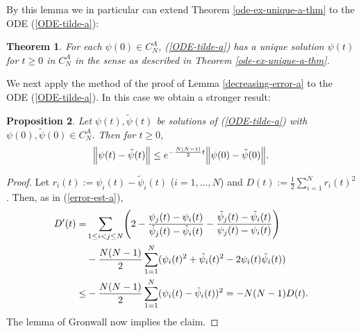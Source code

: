 \documentclass[reqno]{amsart}
\theoremstyle{plain}
\newtheorem{theorem}{Theorem}[section]
\newtheorem{proposition}[theorem]{Proposition}
\theoremstyle{definition}
\numberwithin{equation}{section}
\begin{document}
By this lemma we in particular can extend Theorem \ref{ode-ex-unique-a-thm} to the ODE  (\ref{ODE-tilde-a}):


\begin{theorem}\label{ode-ex-unique-a-thm-stat}
For each $\psi(0)\in C_N^A$,  (\ref{ODE-tilde-a})
has a unique solution $\psi(t)$ for  $t\ge0$ in  $ C_N^A$ in the sense as described in Theorem \ref{ode-ex-unique-a-thm}.
\end{theorem}


We next apply the method of the proof of Lemma \ref{decreasing-error-a} to the ODE  (\ref{ODE-tilde-a}).
In this case we obtain a stronger result:



\begin{proposition}\label{decreasing-error-a-stat}
  Let  $\psi(t),\tilde \psi(t)$ be solutions of (\ref{ODE-tilde-a}) with $\psi(0),\tilde \psi(0)\in C_N^A$.
Then for $t\ge0$,
  $$\Bigl\|\psi(t)-\tilde \psi(t)\Bigr\|\le  e^{- \frac{N(N-1)}{2} t}\Bigl\|\psi(0)-\tilde \psi(0)\Bigr\|.$$ 
 \end{proposition}


 \begin{proof}
   Let $r_i(t):=\psi_i(t)-\tilde \psi_i(t)$ ($i=1,\ldots,N$) and $D(t):=\frac{1}{2}\sum_{i=1}^N r_i(t)^2$. Then, as
   in (\ref{error-est-a}),
\begin{align}
     D^\prime(t) = &
     \sum_{1\le i< j\le N} \Biggl(2-  \frac{ \psi_j(t) - \psi_i(t)}{\tilde \psi_j(t)-\tilde \psi_i(t)}-
     \frac{\tilde \psi_j(t) -\tilde \psi_i(t)}{\psi_j(t)- \psi_i(t)}
     \Biggr)\notag\\
&- \frac{N(N-1)}{2}  \sum_{1=1}^N (\psi_i(t)^2 +\tilde\psi_i(t)^2-2\psi_i(t)\tilde\psi_i(t))\notag\\
     \le& - \frac{N(N-1)}{2} \sum_{1=1}^N (\psi_i(t)-\tilde\psi_i(t))^2 = -N(N-1) D(t).
\notag
   \end{align}
The lemma of Gronwall now implies the claim.
   \end{proof}
\end{document}
